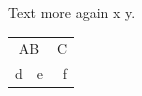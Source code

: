 \documentclass{article}
\begin{document}
Text \hline more \hline again \omit x \span y.

\begin{tabular}{|l|c|r|}
\multicolumn{2}{|c|}{AB} & C \\
d & e & f \\
\end{tabular}
\end{document}
